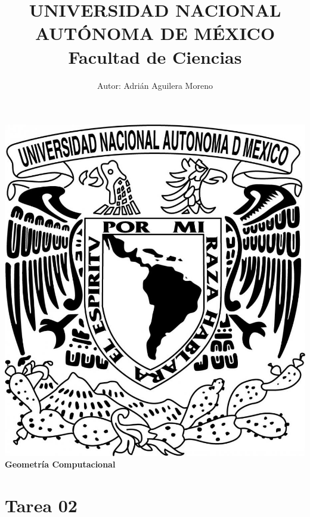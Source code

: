 \documentclass{article}
\begin{document}
\title{UNIVERSIDAD NACIONAL AUT\'ONOMA DE M\'EXICO\\ Facultad de Ciencias}
\author{Autor: Adri\'an Aguilera Moreno}
\date{}
\maketitle
\begin{center}
  \includegraphics[scale=0.20]{../Imagen/Portada.jpg}\\[0.4cm]
  \Large
  \bf{Geometría Computacional}
  \normalsize
\end{center}
\newpage
{}
\section*{\LARGE{Tarea 02}}


\newpage


\newpage


%
%
%
%
%
%
%
%
\end{document}
